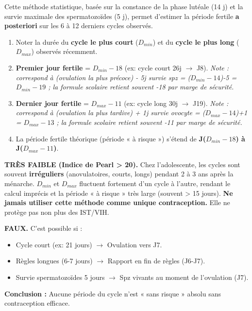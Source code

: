 \documentclass[11pt]{article}
\begin{document}
\begin{methode}
Cette méthode statistique, basée sur la constance de la phase lutéale (14 j) et la survie maximale des spermatozoïdes (5 j), permet d'estimer la période fertile \textbf{a posteriori} sur les 6 à 12 derniers cycles observés.
\begin{enumerate}
    \item Noter la durée du \textbf{cycle le plus court} ($D_{min}$) et du \textbf{cycle le plus long} ($D_{max}$) observés récemment.
    \item \textbf{Premier jour fertile} = $D_{min} - 18$ (ex: cycle court 26j $\rightarrow$ J8). \textit{Note : correspond à (ovulation la plus précoce) - 5j survie spz = ($D_{min}-14$)-5 = $D_{min}-19$ ; la formule scolaire retient souvent -18 par marge de sécurité.}
    \item \textbf{Dernier jour fertile} = $D_{max} - 11$ (ex: cycle long 30j $\rightarrow$ J19). \textit{Note : correspond à (ovulation la plus tardive) + 1j survie ovocyte = ($D_{max}-14$)+1 = $D_{max}-13$ ; la formule scolaire retient souvent -11 par marge de sécurité.}
    \item La période fertile théorique (période « à risque ») s'étend de \textbf{J($D_{min}-18$) à J($D_{max}-11$)}.
\end{enumerate}
\end{methode}

\begin{attention}
\textbf{TRÈS FAIBLE (Indice de Pearl > 20).} Chez l'adolescente, les cycles sont souvent \textbf{irréguliers} (anovulatoires, courts, longs) pendant 2 à 3 ans après la ménarche. $D_{min}$ et $D_{max}$ fluctuent fortement d'un cycle à l'autre, rendant le calcul imprécis et la période « à risque » très large (souvent > 15 jours). \textbf{Ne jamais utiliser cette méthode comme unique contraception.} Elle ne protège pas non plus des IST/VIH.
\end{attention}

\begin{attention}
\textbf{FAUX.} C'est possible si :
\begin{itemize}
    \item Cycle court (ex: 21 jours) $\rightarrow$ Ovulation vers J7.
    \item Règles longues (6-7 jours) $\rightarrow$ Rapport en fin de règles (J6-J7).
    \item Survie spermatozoïdes 5 jours $\rightarrow$ Spz vivants au moment de l'ovulation (J7).
\end{itemize}
\textbf{Conclusion :} Aucune période du cycle n'est « sans risque » absolu sans contraception efficace.
\end{attention}
\end{document}
